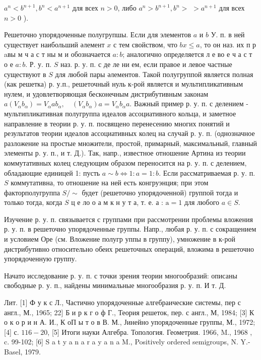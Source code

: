 \documentclass[10pt]{article}
\begin{document}
$a^{n}<b^{n+1}, b^{n}<a^{n+1}$ для всех $n>0$, либо $a^{n}>b^{n+1}, b^{n}>$ $>a^{n+1}$ для всех $n>0$ ).



Решеточно упорядоченные полугрупшы. Если для элементов $a$ и $b$ У. п. в ней существует наибольший әлемент $x$ с тем свойством, что $b x \leqslant a$, то он наз. их п р aвы м ч а с т ны м и обозначается $a: b$; аналогично определяется л е во е ч а с т о е $a: b$. Р. у. п. $S$ наз. р. у. п. с де ле ни ем, если правое и левое частные существуют в $S$ для любой пары әлементов. Такой полугруппой является полная (как решетка) р. у.п., решеточный нуль к-рой является и мультипликативным нулем, и удовлетворяющая бесконечным дистрибутивным законам $a\left(V_{\alpha} b_{\alpha}\right)=V_{\alpha} a b_{\alpha}, \quad\left(V_{\alpha} b_{\alpha}\right) a=V_{\alpha} b_{\alpha} a$. Важный пример р. у. п. с делением - мультипликативная полугруппа идеалов ассоциативного кольца, и заметное направление в теории р. у. п. посвящено перенесению многих понятий и результатов теории идеалов ассоциативных колец на случай р. у. п. (однозначное разложение на простые множители, простой, примарный, максимальный, главный элементы р. у. п., и т. Д.). Так, напр., известное отношение Артина из теории коммутативных колец следующим образом переносится на р. у. п. с делением, обладающие единицей 1: пусть $a \sim b \Leftrightarrow 1: a=1: b$. Если рассматриваемая р. у. п. $S$ коммутативна, то отношение на ней есть конгруэнция; при этом факторполугруппа $S / \sim$ будет (решеточно упорядоченной) группой тогда и только тогда, когда $S$ ц е ло о а м к н у т а, т. е. а : $\mathrm{a}=1$ для любого $a \in S$.



Изучение р. у. п. связывается с группами при рассмотрении проблемы вложения р. у. п. в решеточно упорядоченные группы. Напр., любая р. у. п. с сокращением и условием Оре (см. Вложение полугр уппы в группу), умножение в к-рой дистрибутивно относительно обеих решеточных операций, вложима в решеточно упорядоченную группу.



Начато исследование р. у. п. с точки зрения теории многообразий: описаны свободные р. у. п., найдены минимальные многообразия р. у. п. И т. Д.



Лит. [1] Ф у к с Л., Частично упорядоченные алгебраические системы, пер с англ., М., 1965; 22] Б и р к г о ф Г., Теория решеток, пер. с англ., М, 1984; [3] К о к о р и н А. И., К оП ы т о в В. М., Јинейно упорядоченные группы, М., 1972; [4] с. $116-20$, [5] Итоги науки Алгебра. Топология. Геометрия. 1966, M., 1968 , c. 99-102; [6] S a t y a n a r a y a n a M., Positively ordered semigroups, N. Y.- Basel, 1979.
\end{document}
